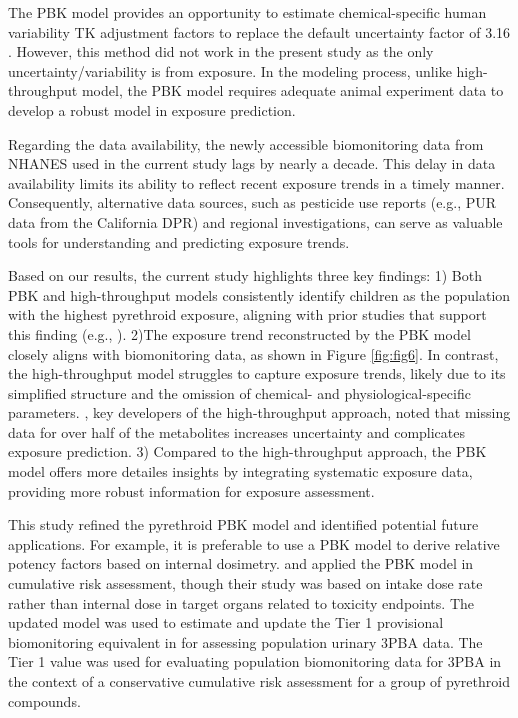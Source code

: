 \documentclass[toxics,article,submit,pdftex,moreauthors]{Definitions/mdpi}
\begin{document}
The PBK model provides an opportunity to estimate chemical-specific human
variability TK adjustment factors to replace the default uncertainty factor of
3.16 \citep{chiu_advancing_2018}. However, this method did not work in the
present study as the only uncertainty/variability is from exposure. In the
modeling process, unlike high-throughput model, the PBK model requires adequate
animal experiment data to develop a robust model in exposure prediction.

Regarding the data availability, the newly accessible biomonitoring
data from NHANES used in the current study lags by nearly a decade. This
delay in data availability limits its ability to reflect recent exposure
trends in a timely manner. Consequently, alternative data sources, such
as pesticide use reports (e.g., PUR data from the California DPR) and
regional investigations, can serve as valuable tools for understanding
and predicting exposure trends.

Based on our results, the current study highlights three key findings: 1) Both 
PBK and high-throughput models consistently identify children
as the population with the highest pyrethroid exposure, aligning with prior
studies that support this finding (e.g., \citep{barr2010urinary}). 2)The
exposure trend reconstructed by the PBK model closely aligns with biomonitoring
data, as shown in Figure \ref{fig:fig6}. In contrast, the high-throughput model struggles to
capture exposure trends, likely due to its simplified structure and the omission of
chemical- and physiological-specific parameters. \citep{stanfield2022bayesian}, key
developers of the high-throughput approach, noted that missing data for over
half of the metabolites increases uncertainty and complicates exposure
prediction. 3) Compared to the high-throughput approach, the PBK model offers more
detailes insights by integrating systematic exposure data, providing more
robust information for exposure assessment.

This study refined the pyrethroid PBK model and identified potential
future applications. For example, it is preferable to use a PBK model to
derive relative potency factors based on internal dosimetry.
\citet{quindroit2021estimating} and \citet{thepaut_pbpk_2024} applied
the PBK model in cumulative risk assessment, though their study was
based on intake dose rate rather than internal dose in target organs
related to toxicity endpoints. The updated model was used to estimate
and update the Tier 1 provisional biomonitoring equivalent in
\citet{aylward_screening_level_2018} for assessing population urinary
3PBA data. The Tier 1 value was used for evaluating population
biomonitoring data for 3PBA in the context of a conservative cumulative
risk assessment for a group of pyrethroid compounds.
\end{document}
